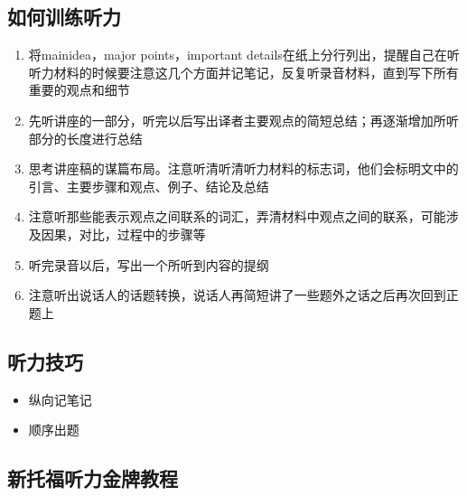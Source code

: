 \documentclass[UTF8]{ctexart}
\begin{document}
\subsection{如何训练听力}
\begin{enumerate}
  \item 将mainidea，major points，important details在纸上分行列出，提醒自己在听听力材料的时候要注意这几个方面并记笔记，反复听录音材料，直到写下所有重要的观点和细节
  \item 先听讲座的一部分，听完以后写出译者主要观点的简短总结；再逐渐增加所听部分的长度进行总结
  \item 思考讲座稿的谋篇布局。注意听清听清听力材料的标志词，他们会标明文中的引言、主要步骤和观点、例子、结论及总结
  \item 注意听那些能表示观点之间联系的词汇，弄清材料中观点之间的联系，可能涉及因果，对比，过程中的步骤等
  \item 听完录音以后，写出一个所听到内容的提纲
  \item 注意听出说话人的话题转换，说话人再简短讲了一些题外之话之后再次回到正题上
\end{enumerate}
\subsection{听力技巧}
\begin{itemize}
\item 纵向记笔记\\
\item 顺序出题\\
\end{itemize}
\subsection{新托福听力金牌教程}
\end{document}
